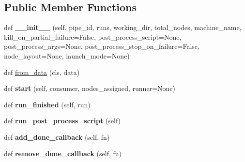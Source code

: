 \subsection*{Public Member Functions}
\begin{DoxyCompactItemize}
\item 
\mbox{\label{classcodar_1_1savanna_1_1model_1_1_pipeline_ada8df2357966f7e3cc7c34d3ee36f9a1}} 
def {\bfseries \+\_\+\+\_\+init\+\_\+\+\_\+} (self, pipe\+\_\+id, runs, working\+\_\+dir, total\+\_\+nodes, machine\+\_\+name, kill\+\_\+on\+\_\+partial\+\_\+failure=False, post\+\_\+process\+\_\+script=None, post\+\_\+process\+\_\+args=None, post\+\_\+process\+\_\+stop\+\_\+on\+\_\+failure=False, node\+\_\+layout=None, launch\+\_\+mode=None)
\item 
def \hyperlink{classcodar_1_1savanna_1_1model_1_1_pipeline_abf71facf9275710199941f0f79997db2}{from\+\_\+data} (cls, data)
\item 
\mbox{\label{classcodar_1_1savanna_1_1model_1_1_pipeline_ad7ddded563710c1a240b850c56a3fd3c}} 
def {\bfseries start} (self, consumer, nodes\+\_\+assigned, runner=None)
\item 
\mbox{\label{classcodar_1_1savanna_1_1model_1_1_pipeline_a0a7fe2d4e57a5604ae9d997caeee2f87}} 
def {\bfseries run\+\_\+finished} (self, run)
\item 
\mbox{\label{classcodar_1_1savanna_1_1model_1_1_pipeline_a9a21933f3cc3457a161029b4f708997b}} 
def {\bfseries run\+\_\+post\+\_\+process\+\_\+script} (self)
\item 
\mbox{\label{classcodar_1_1savanna_1_1model_1_1_pipeline_a05bcb6afe339fb967d8d358d5c6037ca}} 
def {\bfseries add\+\_\+done\+\_\+callback} (self, fn)
\item 
\mbox{\label{classcodar_1_1savanna_1_1model_1_1_pipeline_aa1656c8b4ec886ef96521dfb137c123b}} 
def {\bfseries remove\+\_\+done\+\_\+callback} (self, fn)
\item 
\mbox{\label{classcodar_1_1savanna_1_1model_1_1_pipeline_ac13dbe4331eff67d4306a11a06199e3e}} 

\end{DoxyCompactItemize}
